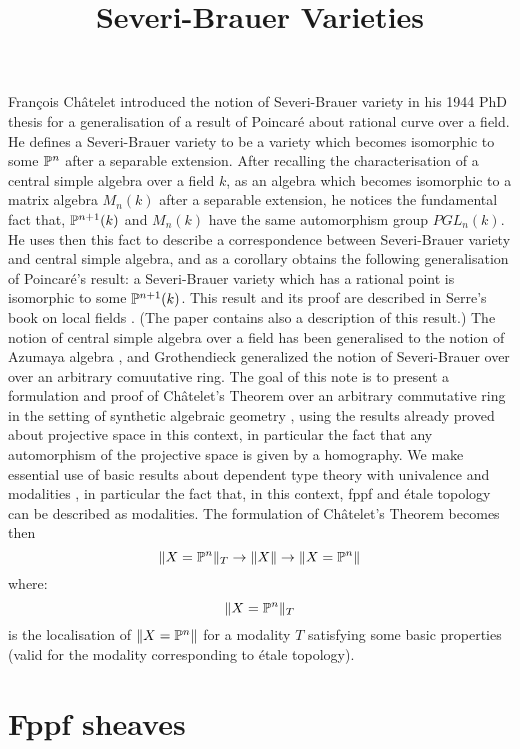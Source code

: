 \documentclass{../util/zariski}
\title{Severi-Brauer Varieties}
\begin{document}
\maketitle

{F}ran\c cois {C}h\^atelet introduced the notion of Severi-Brauer variety in his 1944 PhD thesis
\cite{chatelet44} for a generalisation of a result of Poincar\'e about rational curve over a field.
He defines a Severi-Brauer variety to be a variety which becomes isomorphic to some $\mathbb{P}^n$ after
a separable extension. After recalling the characterisation of a central simple algebra over a field $k$, as
an algebra which becomes isomorphic to a matrix algebra $M_n(k)$ after a separable extension, he notices the fundamental
fact that, $\mathbb{P}^{n+1}(k)$ and $M_n(k)$ have the same automorphism group $PGL_{n}(k)$. He uses then this
fact to describe a correspondence between Severi-Brauer variety and central simple algebra, and as a corollary
obtains the following generalisation of Poincar\'e's result: a Severi-Brauer variety which has a rational point
is isomorphic to some $\mathbb{P}^{n+1}(k)$. This result and its proof are described in Serre's book on local fields \cite{serre62}.
(The paper \cite{colliot88} contains also a description of this result.) The notion of central simple algebra over a field
has been generalised to the notion of Azumaya algebra  \cite{azumaya51}, and
Grothendieck \cite{grothendieck68} generalized the notion of Severi-Brauer over over an arbitrary comuutative ring.
The goal of this note is to present a formulation and proof of Ch\^atelet's Theorem over an arbitrary commutative ring
in the setting of synthetic algebraic geometry \cite{draft}, using the results already proved about projective
space \cite{sag-projective} in this context, in particular the fact that any automorphism of the projective space is given
by a homography. We make essential use of basic results about dependent type theory with univalence \cite{hott}
and modalities \cite{modalities}, in particular the fact that, in this context, fppf and \'etale topology can be described
as modalities. The formulation of Ch\^atelet's Theorem becomes then
\[\lVert X=\mathbb{P}^n \rVert_{T} \to \lVert X \rVert \to \lVert X=\mathbb{P}^n \rVert\]
where:
\[\lVert X=\mathbb{P}^n \rVert_{T}\]
is the localisation of $\lVert X=\mathbb{P}^n \rVert$ for a modality $T$ satisfying some basic properties (valid for the modality
corresponding to \'etale topology).

\tableofcontents

\section{Fppf sheaves}

\end{document}
